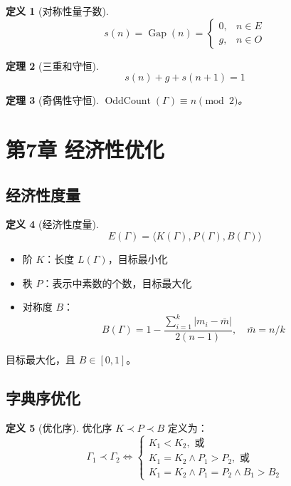 \documentclass[12pt]{article}
\newtheorem{theorem}{定理}[section]
\theoremstyle{definition}
\newtheorem{definition}[theorem]{定义}
\newcommand{\Gap}{\operatorname{Gap}}
\newcommand{\OddCount}{\operatorname{OddCount}}
\begin{document}
\begin{definition}[对称性量子数]
\[
s(n) = \Gap(n) = \begin{cases}
0, & n \in E \\
g, & n \in O
\end{cases}
\]
\end{definition}

\begin{theorem}[三重和守恒]
\[
s(n) + g + s(n+1) = 1
\]
\end{theorem}

\begin{theorem}[奇偶性守恒]
\(\OddCount(\Gamma) \equiv n \pmod{2}\)。
\end{theorem}

\section{第7章 经济性优化}

\subsection{经济性度量}

\begin{definition}[经济性度量]
\[
E(\Gamma) = \langle K(\Gamma), P(\Gamma), B(\Gamma) \rangle
\]
\begin{itemize}
    \item 阶 \(K\)：长度 \(L(\Gamma)\)，目标最小化
    \item 秩 \(P\)：表示中素数的个数，目标最大化
    \item 对称度 \(B\)：
    \[
    B(\Gamma) = 1 - \frac{\sum_{i=1}^k |m_i - \bar{m}|}{2(n-1)},\quad \bar{m} = n/k
    \]
\end{itemize}
目标最大化，且 \(B \in [0,1]\)。
\end{definition}

\subsection{字典序优化}

\begin{definition}[优化序]
优化序 \(K \prec P \prec B\) 定义为：
\[
\Gamma_1 \prec \Gamma_2 \iff
\begin{cases}
K_1 < K_2, \text{ 或} \\
K_1 = K_2 \land P_1 > P_2, \text{ 或} \\
K_1 = K_2 \land P_1 = P_2 \land B_1 > B_2
\end{cases}
\]
\end{definition}
\end{document}
